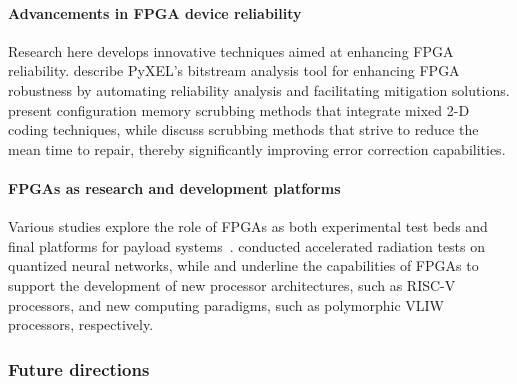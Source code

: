     \paragraph{Advancements in FPGA device reliability}
    Research here develops innovative techniques aimed at enhancing FPGA reliability. %
    \citet{DeSio2023PyXEL:FPGAs} describe %
   PyXEL's %
   bitstream analysis tool for %
   enhancing FPGA robustness by automating reliability analysis and facilitating mitigation solutions.  \citet{Vlagkoulis2022ConfigurationTechnique} present 
   configuration memory scrubbing methods that integrate mixed 2-D coding techniques, while %
\citet{Mousavi2023MTTRSensitivity}
   discuss scrubbing methods %
   that strive to reduce the mean time to repair, %
   thereby significantly improving error correction capabilities.
    
    \paragraph{%
    FPGAs as research and development platforms}
    Various studies explore the role of FPGAs as both experimental test beds and final platforms for payload systems~\cite{Viel2023Payload-XL:FPGA,Forlin2023AnSounds,Bohmer2023NeutronFPGAs}. 
    \citet{Gambardella2022AcceleratedTraining} conducted accelerated radiation tests on quantized neural networks, while \citet{Anders2023AProcessors} and \citet{Hoozemans2018IncreasingProcessor} underline the capabilities of FPGAs to support the development of new processor architectures, such as RISC-V processors, and new computing paradigms, such as polymorphic VLIW processors, respectively. 
  
    
   

\subsubsection*{\bf{Future directions}}

